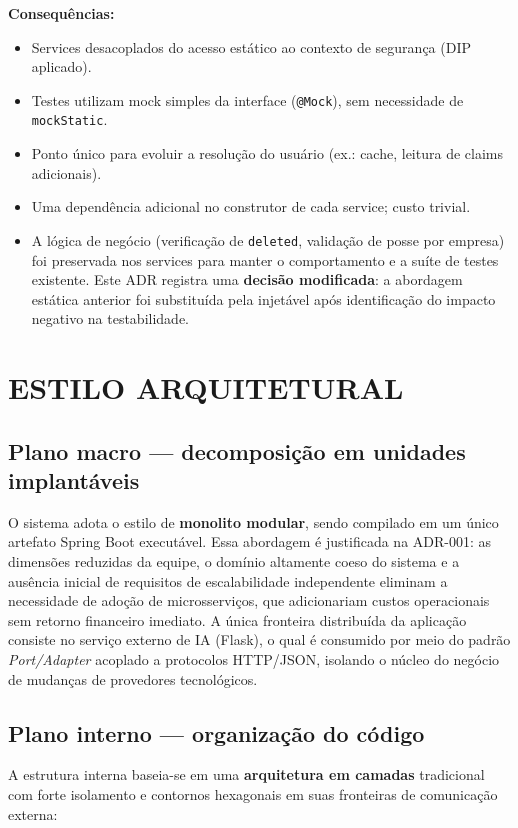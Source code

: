 \documentclass[12pt,a4paper]{article}
\begin{document}
\noindent\textbf{Consequências:}
\begin{itemize}
    \item[+] Services desacoplados do acesso estático ao contexto de segurança (DIP aplicado).
    \item[+] Testes utilizam mock simples da interface (\texttt{@Mock}), sem necessidade de \texttt{mockStatic}.
    \item[+] Ponto único para evoluir a resolução do usuário (ex.: cache, leitura de claims adicionais).
    \item[--] Uma dependência adicional no construtor de cada service; custo trivial.
    \item[] A lógica de negócio (verificação de \texttt{deleted}, validação de posse por empresa) foi preservada nos services para manter o comportamento e a suíte de testes existente. Este ADR registra uma \textbf{decisão modificada}: a abordagem estática anterior foi substituída pela injetável após identificação do impacto negativo na testabilidade.
\end{itemize}

\newpage
\section{ESTILO ARQUITETURAL}

\subsection{Plano macro — decomposição em unidades implantáveis}
O sistema adota o estilo de \textbf{monolito modular}, sendo compilado em um único artefato Spring Boot executável. Essa abordagem é justificada na ADR-001: as dimensões reduzidas da equipe, o domínio altamente coeso do sistema e a ausência inicial de requisitos de escalabilidade independente eliminam a necessidade de adoção de microsserviços, que adicionariam custos operacionais sem retorno financeiro imediato. A única fronteira distribuída da aplicação consiste no serviço externo de IA (Flask), o qual é consumido por meio do padrão \textit{Port/Adapter} acoplado a protocolos HTTP/JSON, isolando o núcleo do negócio de mudanças de provedores tecnológicos.

\subsection{Plano interno — organização do código}
A estrutura interna baseia-se em uma \textbf{arquitetura em camadas} tradicional com forte isolamento e contornos hexagonais em suas fronteiras de comunicação externa:
\end{document}

